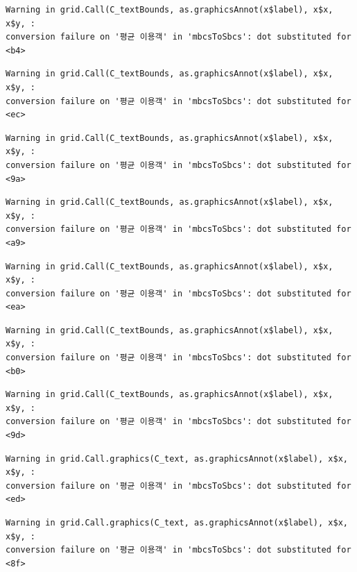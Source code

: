 \documentclass[
  letterpaper,
  DIV=11,
  numbers=noendperiod]{scrreprt}
\begin{document}
\begin{verbatim}
Warning in grid.Call(C_textBounds, as.graphicsAnnot(x$label), x$x, x$y, :
conversion failure on '평균 이용객' in 'mbcsToSbcs': dot substituted for <b4>
\end{verbatim}

\begin{verbatim}
Warning in grid.Call(C_textBounds, as.graphicsAnnot(x$label), x$x, x$y, :
conversion failure on '평균 이용객' in 'mbcsToSbcs': dot substituted for <ec>
\end{verbatim}

\begin{verbatim}
Warning in grid.Call(C_textBounds, as.graphicsAnnot(x$label), x$x, x$y, :
conversion failure on '평균 이용객' in 'mbcsToSbcs': dot substituted for <9a>
\end{verbatim}

\begin{verbatim}
Warning in grid.Call(C_textBounds, as.graphicsAnnot(x$label), x$x, x$y, :
conversion failure on '평균 이용객' in 'mbcsToSbcs': dot substituted for <a9>
\end{verbatim}

\begin{verbatim}
Warning in grid.Call(C_textBounds, as.graphicsAnnot(x$label), x$x, x$y, :
conversion failure on '평균 이용객' in 'mbcsToSbcs': dot substituted for <ea>
\end{verbatim}

\begin{verbatim}
Warning in grid.Call(C_textBounds, as.graphicsAnnot(x$label), x$x, x$y, :
conversion failure on '평균 이용객' in 'mbcsToSbcs': dot substituted for <b0>
\end{verbatim}

\begin{verbatim}
Warning in grid.Call(C_textBounds, as.graphicsAnnot(x$label), x$x, x$y, :
conversion failure on '평균 이용객' in 'mbcsToSbcs': dot substituted for <9d>
\end{verbatim}

\begin{verbatim}
Warning in grid.Call.graphics(C_text, as.graphicsAnnot(x$label), x$x, x$y, :
conversion failure on '평균 이용객' in 'mbcsToSbcs': dot substituted for <ed>
\end{verbatim}

\begin{verbatim}
Warning in grid.Call.graphics(C_text, as.graphicsAnnot(x$label), x$x, x$y, :
conversion failure on '평균 이용객' in 'mbcsToSbcs': dot substituted for <8f>
\end{verbatim}
\end{document}
